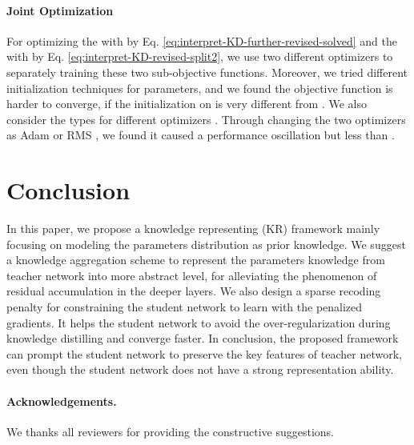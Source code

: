 \documentclass[10pt,twocolumn,letterpaper]{article}
\begin{document}
\paragraph{Joint Optimization}
For optimizing the  with  by Eq. \ref{eq:interpret-KD-further-revised-solved}
and the  with  by Eq. \ref{eq:interpret-KD-revised-split2},
we use two different optimizers to separately training these two sub-objective functions.
Moreover,
we tried different initialization techniques for parameters,
and we found the objective function is harder to converge,
if the initialization on  is very different from .
We also consider the types for different optimizers \cite{adam2014, Bottou2012, rmsprop2012}.
Through changing the two optimizers as Adam \cite{adam2014} or RMS \cite{rmsprop2012},
we found it caused a performance oscillation but less than .

\section{Conclusion}
In this paper,
we propose a knowledge representing (KR) framework
mainly focusing on modeling the parameters distribution as prior knowledge.
We suggest a knowledge aggregation scheme to
represent the parameters knowledge from teacher network into more abstract level,
for alleviating the phenomenon of residual accumulation in the deeper layers.
We also design a sparse recoding penalty for constraining
the student network to learn with the penalized gradients.
It helps the student network to avoid
the over-regularization during knowledge distilling and converge faster.
In conclusion,
the proposed framework can prompt the student network
to preserve the key features of teacher network,
even though the student network does not have a strong representation ability.

\paragraph{Acknowledgements.} We thanks all reviewers for providing the constructive suggestions.

{\small


}
\end{document}
